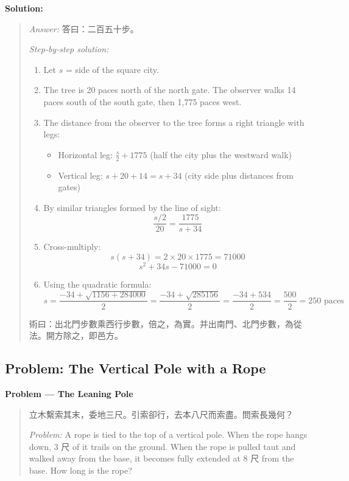 \documentclass[11pt,a4paper]{article}
\newcommand{\zh}[1]{{#1}}
\newenvironment{chproblem}[1][]{%
  \par\medskip\noindent\textbf{\textcolor{sectioncolor}{#1}}\par\nopagebreak
  \begin{quote}\small
}{%
  \end{quote}\medskip
}
\newenvironment{chsolution}{%
  \par\medskip\noindent\textbf{\textcolor{notecolor}{Solution:}}\par\nopagebreak
  \begin{quote}\small
}{%
  \end{quote}\medskip
}
\newenvironment{stepbystep}{%
  \par\smallskip\noindent\textit{Step-by-step solution:}\par\nopagebreak
  \begin{enumerate}[leftmargin=2em,label=\textbf{Step \arabic*:},ref=\arabic*]
}{%
  \end{enumerate}\medskip
}
\begin{document}
\begin{chsolution}
\textit{Answer:} \zh{答曰：二百五十步。}

\begin{stepbystep}
\item Let $s$ = side of the square city.

\item The tree is 20 paces north of the north gate. The observer walks 14
paces south of the south gate, then 1,775 paces west.

\item The distance from the observer to the tree forms a right triangle with legs:
\begin{itemize}
\item Horizontal leg: $\frac{s}{2} + 1775$ (half the city plus the westward walk)
\item Vertical leg: $s + 20 + 14 = s + 34$ (city side plus distances from gates)
\end{itemize}

\item By similar triangles formed by the line of sight:
\[
\frac{s/2}{20} = \frac{1775}{s + 34}
\]

\item Cross-multiply:
\[
s(s + 34) = 2 \times 20 \times 1775 = 71000
\]
\[
s^2 + 34s - 71000 = 0
\]

\item Using the quadratic formula:
\[
s = \frac{-34 + \sqrt{1156 + 284000}}{2} = \frac{-34 + \sqrt{285156}}{2} = \frac{-34 + 534}{2} = \frac{500}{2} = 250 \text{ paces}
\]
\end{stepbystep}

\zh{術曰：出北門步數乘西行步數，倍之，為實。并出南門、北門步數，為從法。開方除之，即邑方。}
\end{chsolution}

\subsection{Problem: The Vertical Pole with a Rope}

\begin{chproblem}[Problem --- The Leaning Pole]
\zh{立木繫索其末，委地三尺。引索卻行，去本八尺而索盡。問索長幾何？}

\medskip
\textit{Problem:} A rope is tied to the top of a vertical pole. When the rope
hangs down, 3 \zh{尺} of it trails on the ground. When the rope is pulled
taut and walked away from the base, it becomes fully extended at 8 \zh{尺}
from the base. How long is the rope?
\end{chproblem}
\end{document}
